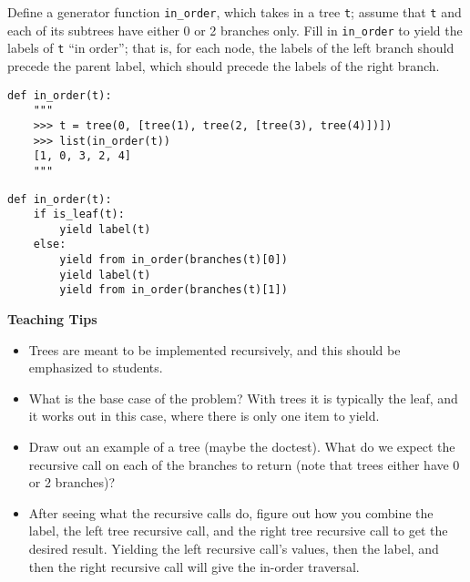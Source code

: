\begin{blocksection}
\question
Define a generator function \lstinline{in_order}, which takes in a tree \lstinline{t}; assume that \lstinline{t} and each of its subtrees have either 0 or 2 branches only. Fill in \lstinline{in_order} to yield the labels of \lstinline{t} ``in order''; that is, for each node, the labels of the left branch should precede the parent label, which should precede the labels of the right branch. 

\begin{lstlisting}
def in_order(t):
    """
    >>> t = tree(0, [tree(1), tree(2, [tree(3), tree(4)])])
    >>> list(in_order(t))
    [1, 0, 3, 2, 4]
    """
\end{lstlisting}

\begin{solution}[3 in.]
\begin{lstlisting}
def in_order(t):
    if is_leaf(t):
        yield label(t)
    else:
        yield from in_order(branches(t)[0])
        yield label(t)
        yield from in_order(branches(t)[1])
\end{lstlisting}
\end{solution}
\end{blocksection}

\begin{guide}
\begin{blocksection}
\textbf{Teaching Tips}
    \begin{itemize}
    \item Trees are meant to be implemented recursively, and this should be emphasized to students.
    \item What is the base case of the problem? With trees it is typically the leaf, and it works out in this case, where there is only one item to yield.
    \item Draw out an example of a tree (maybe the doctest). What do we expect the recursive call on each of the branches to return (note that trees either have 0 or 2 branches)?
    \item After seeing what the recursive calls do, figure out how you combine the label, the left tree recursive call, and the right tree recursive call to get the desired result. Yielding the left recursive call's values, then the label, and then the right recursive call will give the in-order traversal.
    \end{itemize}
\end{blocksection}
\end{guide}